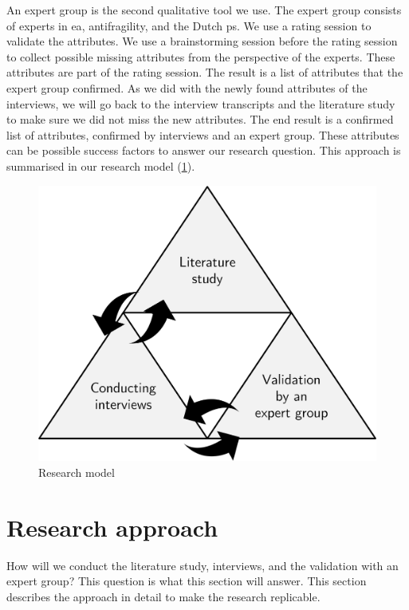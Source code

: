 An expert group is the second qualitative tool we use. The expert group consists of experts in \gls{ea}, \gls{antifragility}, and the Dutch \gls{ps}. We use a rating  session to validate the \glspl{attribute}. We use a brainstorming session before the rating session to collect possible missing \glspl{attribute} from the perspective of the experts. These \glspl{attribute} are part of the rating session. The result is a list of \glspl{attribute} that the expert group confirmed. As we did with the newly found \glspl{attribute} of the interviews, we will go back to the interview transcripts and the literature study to make sure we did not miss the new attributes. The end result is a confirmed list of \glspl{attribute}, confirmed by interviews and an expert group. These attributes can be possible success factors to answer our research question. This approach is summarised in our research model (\cref{fig:researchmodel}).
\begin{figure}[H]
	\centering
	\includegraphics[width=0.45\linewidth]{images/researchmodel}
	\caption[Research model]{Research model}
	\label{fig:researchmodel}
\end{figure}

\section{Research approach}
\label{sec:researchapproach}
How will we conduct the literature study, interviews, and the validation with an expert group? This question is what this section will answer. This section describes the approach in detail to make the research replicable.

